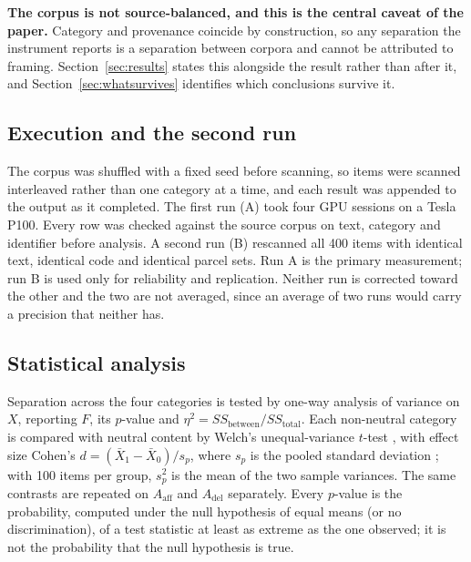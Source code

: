 \documentclass[preprint,12pt]{elsarticle}
\begin{document}
\textbf{The corpus is not source-balanced, and this is the central caveat of the paper.}
Category and provenance coincide by construction, so any separation the instrument reports is
a separation between corpora and cannot be attributed to framing. Section~\ref{sec:results}
states this alongside the result rather than after it, and Section~\ref{sec:whatsurvives}
identifies which conclusions survive it.

\subsection{Execution and the second run}

The corpus was shuffled with a fixed seed before scanning, so items were scanned
interleaved rather than one category at a time, and each result was appended to the output
as it completed. The first run (A) took four GPU sessions on a Tesla P100. Every row was
checked against the source corpus on text, category and identifier before analysis. A second
run (B) rescanned all 400 items with identical text, identical code and identical parcel
sets. Run A is the primary measurement; run B is used only for reliability and replication.
Neither run is corrected toward the other and the two are not averaged, since an average of
two runs would carry a precision that neither has.

\subsection{Statistical analysis}
\label{sec:stats}

Separation across the four categories is tested by one-way analysis of variance on $X$,
reporting $F$, its $p$-value and $\eta^2 = SS_{\text{between}}/SS_{\text{total}}$. Each
non-neutral category is compared with neutral content by Welch's unequal-variance $t$-test
\cite{welch1947}, with effect size Cohen's $d = (\bar{X}_1 - \bar{X}_0)/s_p$, where $s_p$ is
the pooled standard deviation \cite{cohen1988}; with 100 items per group, $s_p^2$ is the mean
of the two sample variances. The same contrasts are repeated on $A_{\text{aff}}$ and
$A_{\text{del}}$ separately. Every $p$-value is the probability, computed under the null
hypothesis of equal means (or no discrimination), of a test statistic at least as extreme as
the one observed; it is not the probability that the null hypothesis is true.
\end{document}
